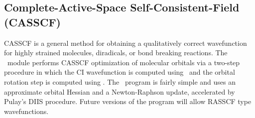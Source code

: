 \subsection{Complete-Active-Space Self-Consistent-Field (CASSCF)} \label{casscf}
                                                                                
CASSCF is a general method for obtaining a qualitatively correct
wavefunction for highly strained molecules, diradicals, or bond
breaking reactions.  The \PSIdetcasman\ module performs
CASSCF optimization of molecular orbitals via a two-step
procedure in which the CI wavefunction is computed using
\PSIdetci\, and the orbital rotation step is computed using
\PSIdetcas.  The \PSIdetcas\ program is fairly simple
and uses an approximate orbital Hessian and a Newton-Raphson update,
accelerated by Pulay's DIIS procedure.  Future versions of the
program will allow RASSCF type wavefunctions.

